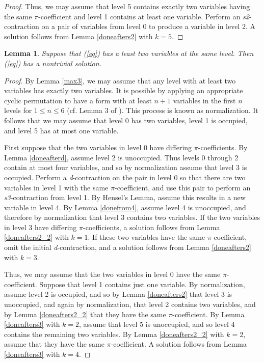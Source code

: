 \documentclass{article}
\newtheorem{lemma}{Lemma}
\begin{document}
\begin{proof}
Thus, we may assume that level 5 contains exactly two variables having the same $\pi$-coefficient and level 1 contains at least one variable.  Perform an \textit{s2}-contraction on a pair of variables from level 0 to produce a variable in level 2.  A solution follows from Lemma \ref{doneafters2} with $k=5$.
\end{proof}

\begin{lemma}\label{max2}
Suppose that (\ref{eq}) has a least two variables at the same level.  Then (\ref{eq}) has a nontrivial solution.
\end{lemma}
\begin{proof}

By Lemma \ref{max3}, we may assume that any level with at least two variables has exactly two variables.  It is possible by applying an appropriate cyclic permutation to have a form with at least $n+1$ variables in the first $n$ levels for $1 \le n \le 6$  (cf. Lemma 3 of \cite{knapp2016solubility}).  This process is known as normalization.  It follows that we may assume that level 0 has two variables, level 1 is occupied, and level 5 has at most one variable.

First suppose that the two variables in level 0 have differing $\pi$-coefficients.  By Lemma \ref{doneafterd}, assume level 2 is unoccupied.  Thus levels 0 through 2 contain at most four variables, and so by normalization assume that level 3 is occupied.  Perform a \textit{d}-contraction on the pair in level 0 so that there are two variables in level 1 with the same $\pi$-coefficient, and use this pair to perform an \textit{s3}-contraction from level 1.  By Hensel's Lemma, assume this results in a new variable in level 4.  By Lemma \ref{donefrom4}, assume level 4 is unoccupied, and therefore by normalization that level 3 contains two variables.  If the two variables in level 3 have differing $\pi$-coefficients, a solution follows from Lemma \ref{doneafters2_2} with $k=1$.  If these two variables have the same $\pi$-coefficient, omit the initial \textit{d}-contraction, and a solution follows from Lemma \ref{doneafters2} with $k=3$.

Thus, we may assume that the two variables in level 0 have the same $\pi$-coefficient.  Suppose that level 1 contains just one variable.  By normalization, assume level 2 is occupied, and so by Lemma \ref{doneafters2} that level 3 is unoccupied, and again by normalization, that level 2 contains two variables, and by Lemma \ref{doneafters2_2} that they have the same $\pi$-coefficient.  By Lemma \ref{doneafters3} with $k=2$, assume that level 5 is unoccupied, and so level 4 contains the remaining two variables.  By Lemma \ref{doneafters2_2} with $k=2$, assume that they have the same $\pi$-coefficient.  A solution follows from Lemma \ref{doneafters3} with $k=4$.


\end{proof}
\end{document}
